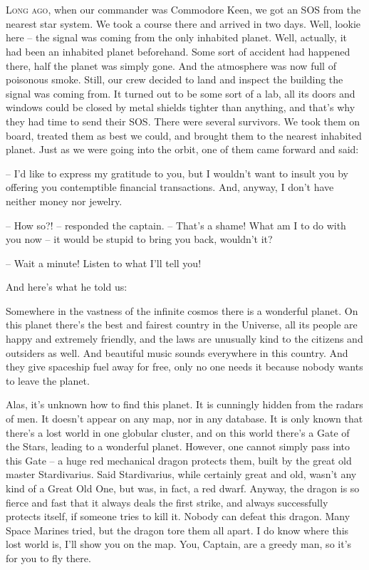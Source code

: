 \documentclass[ebook,twoside,final,openright]{memoir}
\begin{document}
\chapter{}
\par
\lettrine{L}{ong ago,} when our commander was Commodore Keen, we got an SOS from the nearest star system. We took a course there and arrived in two days. Well, lookie here – the signal was coming from the only inhabited planet. Well, actually, it had been an inhabited planet beforehand. Some sort of accident had happened there, half the planet was simply gone. And the atmosphere was now full of poisonous smoke. Still, our crew decided to land and inspect the building the signal was coming from. It turned out to be some sort of a lab, all its doors and windows could be closed by metal shields tighter than anything, and that's why they had time to send their SOS. There were several survivors. We took them on board, treated them as best we could, and brought them to the nearest inhabited planet. Just as we were going into the orbit, one of them came forward and said: \par
\par
– I'd like to express my gratitude to you, but I wouldn’t want to insult you by offering you contemptible financial transactions. And, anyway, I don’t have neither money nor jewelry.\par
– How so?! – responded the captain. – That's a shame! What am I to do with you now – it would be stupid to bring you back, wouldn’t it? \par
– Wait a minute! Listen to what I’ll tell you! \par
 And here’s what he told us:\par
\par
Somewhere in the vastness of the infinite cosmos there is a wonderful planet. On this planet there’s the best and fairest country in the Universe, all its people are happy and extremely friendly, and the laws are unusually kind to the citizens and outsiders as well. And beautiful music sounds everywhere in this country. And they give spaceship fuel away for free, only no one needs it because nobody wants to leave the planet. \par
Alas, it’s unknown how to find this planet. It is cunningly hidden from the radars of men. It doesn’t appear on any map, nor in any database. It is only known that there’s a lost world in one globular cluster, and on this world there’s a Gate of the Stars, leading to a wonderful planet. However, one cannot simply pass into this Gate – a huge red mechanical dragon protects them, built by the great old master Stardivarius. Said Stardivarius, while certainly great and old, wasn’t any kind of a Great Old One, but was, in fact, a red dwarf. Anyway, the dragon is so fierce and fast that it always deals the first strike, and always successfully protects itself, if someone tries to kill it. Nobody can defeat this dragon. Many Space Marines tried, but the dragon tore them all apart. I do know where this lost world is, I'll show you on the map. You, Captain, are a greedy man, so it’s for you to fly there.\par
\end{document}
